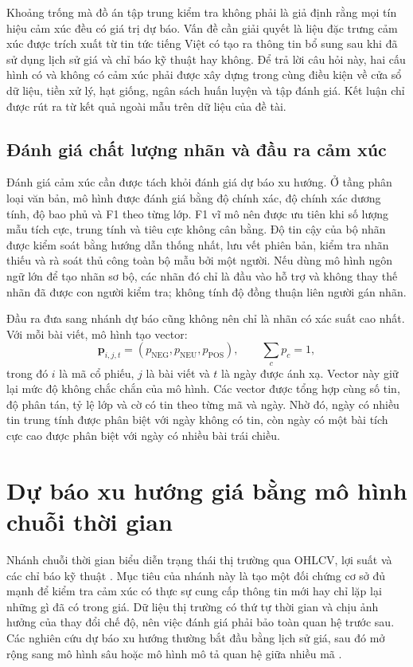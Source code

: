 Khoảng trống mà đồ án tập trung kiểm tra không phải là giả định rằng mọi tín hiệu cảm
xúc đều có giá trị dự báo. Vấn đề cần giải quyết là liệu đặc trưng cảm xúc được trích
xuất từ tin tức tiếng Việt có tạo ra thông tin bổ sung sau khi đã sử dụng lịch sử giá và
chỉ báo kỹ thuật hay không. Để trả lời câu hỏi này, hai cấu hình có và không có cảm xúc
phải được xây dựng trong cùng điều kiện về cửa sổ dữ liệu, tiền xử lý, hạt giống, ngân sách
huấn luyện và tập đánh giá. Kết luận chỉ được rút ra từ kết quả ngoài mẫu trên dữ liệu
của đề tài.

\subsection{Đánh giá chất lượng nhãn và đầu ra cảm xúc}

Đánh giá cảm xúc cần được tách khỏi đánh giá dự báo xu hướng. Ở tầng phân loại văn
bản, mô hình được đánh giá bằng độ chính xác, độ chính xác dương tính, độ bao phủ và F1 theo từng lớp.
F1 vĩ mô nên được ưu tiên khi số lượng mẫu tích cực, trung tính và tiêu cực không cân bằng.
Độ tin cậy của bộ nhãn được kiểm soát bằng hướng dẫn thống nhất, lưu vết phiên bản,
kiểm tra nhãn thiếu và rà soát thủ công toàn bộ mẫu bởi một người. Nếu dùng mô hình
ngôn ngữ lớn để tạo nhãn sơ bộ, các nhãn đó chỉ là đầu vào hỗ trợ và không thay thế
nhãn đã được con người kiểm tra; không tính độ đồng thuận liên người gán nhãn.

Đầu ra đưa sang nhánh dự báo cũng không nên chỉ là nhãn có xác suất cao nhất. Với mỗi
bài viết, mô hình tạo vector:
\[
  \mathbf{p}_{i,j,t}=(p_{\mathrm{NEG}},p_{\mathrm{NEU}},p_{\mathrm{POS}}),
  \qquad \sum_c p_c=1,
\]
trong đó $i$ là mã cổ phiếu, $j$ là bài viết và $t$ là ngày được ánh xạ. Vector này
giữ lại mức độ không chắc chắn của mô hình. Các vector được tổng hợp cùng số tin,
độ phân tán, tỷ lệ lớp và cờ có tin theo từng mã và ngày. Nhờ đó, ngày có nhiều tin
trung tính được phân biệt với ngày không có tin, còn ngày có một bài tích cực cao được
phân biệt với ngày có nhiều bài trái chiều.

\section{Dự báo xu hướng giá bằng mô hình chuỗi thời gian}
\label{sec:tq-timeseries}

Nhánh chuỗi thời gian biểu diễn trạng thái thị trường qua OHLCV, lợi suất và các chỉ
báo kỹ thuật \cite{Wilder1978_rsi,Appel2005_macd}. Mục tiêu của nhánh này là tạo một đối chứng cơ sở đủ mạnh để kiểm tra cảm xúc
có thực sự cung cấp thông tin mới hay chỉ lặp lại những gì đã có trong giá. Dữ liệu
thị trường có thứ tự thời gian và chịu ảnh hưởng của thay đổi chế độ, nên việc đánh
giá phải bảo toàn quan hệ trước sau. Các nghiên cứu dự báo xu hướng thường bắt đầu bằng
lịch sử giá, sau đó mở rộng sang mô hình sâu hoặc mô hình mô tả quan hệ giữa nhiều mã
\cite{Feng2018_181009936v2,Xu2021_211013716v2}.

